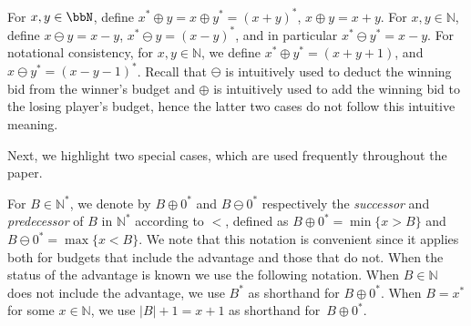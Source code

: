 \documentclass{theoretics}
\newcommand{\Nat}{\mathbb{N}}
\renewcommand{\set}[1]{\{ #1  \}}
\newcommand{\succb}[1]{#1 \oplus 0^*\xspace}
\newcommand{\predb}[1]{#1 \ominus 0^*\xspace}
\begin{document}
  \begin{definition}
    For \(x, y \in \bbN\), define $x^* \oplus y = x \oplus y^* = (x + y)^*$, $x \oplus y = x+y$. For $x,y \in \Nat$, define \(x \ominus y = x-y\), \(x^* \ominus y = (x-y)^*\), and in particular $x^* \ominus y^* = x-y$.
	For notational consistency, for \(x, y \in \Nat\), we define \(x^* \oplus y^* = (x+y+1)\), and \(x \ominus y^* = (x - y - 1)^*\). 
	Recall that $\ominus$ is intuitively used to deduct the winning bid from the winner's budget and \(\oplus\) is intuitively used to add the winning bid to the losing player's budget,
	hence the latter two cases do not follow this intuitive meaning.
\end{definition}

Next, we highlight two special cases, which are used frequently throughout the paper. 


\begin{definition}
For $B \in \Nat^*$, we denote by $\succb{B}$ and $\predb{B}$ respectively the {\em successor} and {\em predecessor} of $B$ in $\Nat^*$ according to $<$, defined as $\succb{B} = \min \set{x > B}$ and $\predb{B} = \max \set{x < B}$.
We note that this notation is convenient since it applies both for budgets that include the advantage and those that do not. When the status of the advantage is known we use the following notation. When \(B \in \Nat\) does not include the advantage, we use \(B^*\) as shorthand for \(\succb{B}\). 
When \(B = x^*\) for some \(x \in \Nat\), we use \(|B|+1 = x+ 1\) as shorthand for~\(\succb{B}\). 
\end{definition}
\end{document}
